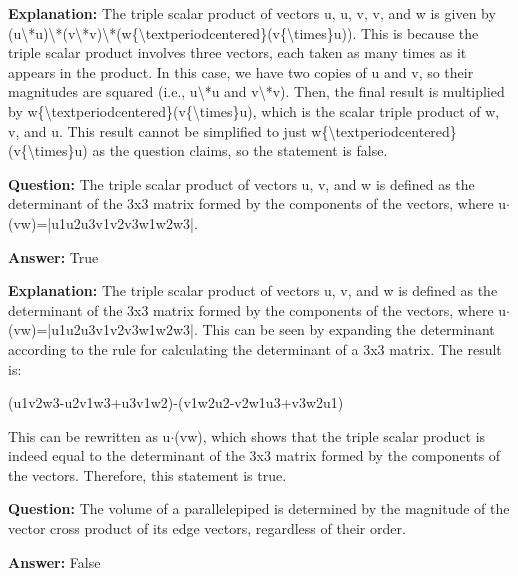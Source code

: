 \documentclass{article}
\begin{document}
                \textbf{Explanation:} The triple scalar product of vectors u, u, v, v, and w is given by (u{\textbackslash}*u){\textbackslash}*(v{\textbackslash}*v){\textbackslash}*(w\{{\textbackslash}textperiodcentered\}(v\{{\textbackslash}times\}u)). This is because the triple scalar product involves three vectors, each taken as many times as it appears in the product. In this case, we have two copies of u and v, so their magnitudes are squared (i.e., u{\textbackslash}*u and v{\textbackslash}*v). Then, the final result is multiplied by w\{{\textbackslash}textperiodcentered\}(v\{{\textbackslash}times\}u), which is the scalar triple product of w, v, and u. This result cannot be simplified to just w\{{\textbackslash}textperiodcentered\}(v\{{\textbackslash}times\}u) as the question claims, so the statement is false.
                
                \vspace{0.5cm} 
        
            
                \textbf {Question:} The triple scalar product of vectors u, v, and w is defined as the determinant of the 3x3 matrix formed by the components of the vectors, where u\ensuremath{\cdot}(v{\texttimes}w)=|u1u2u3v1v2v3w1w2w3|.
                
                \textbf{Answer:} True

                \textbf{Explanation:} The triple scalar product of vectors u, v, and w is defined as the determinant of the 3x3 matrix formed by the components of the vectors, where u\ensuremath{\cdot}(v{\texttimes}w)=|u1u2u3v1v2v3w1w2w3|. This can be seen by expanding the determinant according to the rule for calculating the determinant of a 3x3 matrix. The result is:

(u1v2w3-u2v1w3+u3v1w2)-(v1w2u2-v2w1u3+v3w2u1)

This can be rewritten as u\ensuremath{\cdot}(v{\texttimes}w), which shows that the triple scalar product is indeed equal to the determinant of the 3x3 matrix formed by the components of the vectors. Therefore, this statement is true.
                
                \vspace{0.5cm} 
        
            
                \textbf {Question:} The volume of a parallelepiped is determined by the magnitude of the vector cross product of its edge vectors, regardless of their order.
                
                \textbf{Answer:} False
\end{document}
